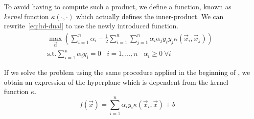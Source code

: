 To avoid having to compute such a product, we define a function, known as \emph{kernel} function
$\kappa(\cdot, \cdot)$ which actually defines the inner-product. We can rewrite~\ref{eq:hd-dual} to use the newly introduced function. 
\begin{equation}
	\label{eq:hd-dual-kf}
	\begin{aligned}
		 & \max_{\vec{\alpha}}\left(\sum_{i = 1}^n{\alpha_i} - \frac{1}{2}\sum_{i =
		1}^n\sum_{j = 1}^n{\alpha_i\alpha_j y_i y_j \kappa(\vec{x}_i, \vec{x}_j)}\right) \\
		 & \text{s.t.} \sum_{i = 1}^n{\alpha_i y_i} = 0 \hspace{10pt} i = 1, \ldots, n
		 \hspace{10pt} \alpha_i \geq 0 \hspace{3pt} \forall i
	\end{aligned}
\end{equation}

If we solve the problem using the same procedure applied in the beginning of , we obtain
an expression of the hyperplane which is dependent from the kernel function $\kappa$.
\begin{equation}
	\label{eq:hd-of}
	f(\vec{x}) = \sum_{i = 1}^n\alpha_iy_i\kappa(\vec{x}_i, \vec{x}) + b
\end{equation}

